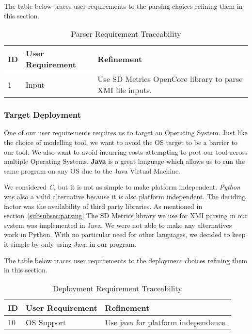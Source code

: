 The table below traces user requirements to the parsing choices refining them in this section.
\begin{table}[htbp]
    \centering
    \caption{Parser Requirement Traceability}\label{tab:parse-choice-table}
    \begin{tabularx}{\textwidth}{| l | l | X |}
        \hline
        \textbf{ID} & \textbf{User Requirement} & \textbf{Refinement} \\
        \hline
        1 & Input & Use SD Metrics OpenCore library to parse XMI file inputs. \\ \hline
    \end{tabularx}
\end{table}

\newpage
\subsubsection{Target Deployment}
One of our user requirements requires us to target an Operating System.
Just like the choice of modelling tool, we want to avoid the OS target to be a barrier to our tool.
We also want to avoid incurring costs attempting to port our tool across multiple Operating Systems.
\textbf{Java} is a great language which allows us to run the same program on any OS due to the Java Virtual Machine.

We considered \textit{C}, but it is not as simple to make platform independent.
\textit{Python} was also a valid alternative because it is also platform independent.
The deciding factor was the availability of third party libraries.
As mentioned in section~\ref{subsubsec:parsing} The SD Metrics library we use for XMI parsing in our system was implemented in Java.
We were not able to make any alternatives work in Python.
With no particular need for other languages, we decided to keep it simple by only using Java in our program.

The table below traces user requirements to the deployment choices refining them in this section.
\begin{table}[htbp]
    \centering
    \caption{Deployment Requirement Traceability}\label{tab:os-choice-table}
    \begin{tabularx}{\textwidth}{| l | l | X |}
        \hline
        \textbf{ID} & \textbf{User Requirement} & \textbf{Refinement} \\
        \hline
        10 & OS Support & Use java for platform independence. \\ \hline
    \end{tabularx}
\end{table}

